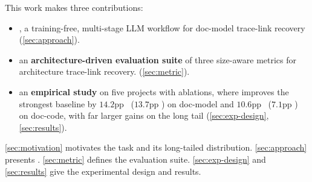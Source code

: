 This work makes three contributions:
\begin{itemize}[leftmargin=*]
    \item \textbf{\approach}, a training-free, multi-stage \ac{LLM} workflow for doc-model trace-link recovery (\autoref{sec:approach}).
    \item an \textbf{architecture-driven evaluation suite} of three size-aware metrics for architecture trace-link recovery. (\autoref{sec:metric}).
    \item an \textbf{empirical study} on five projects with ablations, where \approach improves the strongest baseline by $14.2$pp \fone\ ($13.7$pp \ftwo) on doc-model and $10.6$pp \fone\ ($7.1$pp \ftwo) on doc-code, with far larger gains on the long tail (\autoref{sec:exp-design}, \autoref{sec:results}).
\end{itemize}

\autoref{sec:motivation} motivates the task and its long-tailed distribution.
\autoref{sec:approach} presents \approach.
\autoref{sec:metric} defines the evaluation suite.
\autoref{sec:exp-design} and \autoref{sec:results} give the experimental design and results.

